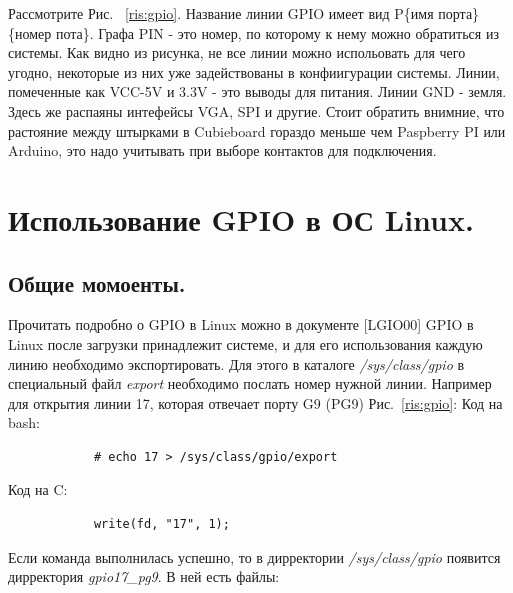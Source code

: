 \documentclass[a4paper,12pt]{report} %
\begin{document}
	Рассмотрите Рис. ~\ref{ris:gpio}. Название линии GPIO имеет вид P\{имя
	порта\}\{номер пота\}.
	Графа PIN - это номер, по которому к нему можно обратиться из системы. Как видно из рисунка, не
	все линии можно испольовать для чего угодно, некоторые из них уже задействованы
	в конфиигурации системы.\cite{hub}
	Линии, помеченные как VCC-5V и 3.3V - это выводы для питания. Линии GND - земля.
	Здесь же распаяны интефейсы VGA, SPI и другие.
	Стоит обратить внимние, что растояние между штырками в Cubieboard гораздо меньше
	чем Paspberry PI или Arduino, это надо учитывать при выборе контактов для
	подключения.
	\section{Использование GPIO в ОС Linux.}
		\subsection{Общие момоенты.}
			Прочитать подробно о GPIO в Linux можно в документе [LGIO00]
			GPIO в Linux после загрузки принадлежит системе, и для его использования каждую
			линию необходимо экспортировать. Для этого в каталоге \emph{/sys/class/gpio}
			в специальный файл \emph{export} необходимо послать номер нужной линии.
			Например для открытия линии 17, которая отвечает порту G9 (PG9) Рис.~\ref{ris:gpio}:
			Код на bash:
			\begin{verbatim}
			# echo 17 > /sys/class/gpio/export
			\end{verbatim}
			Код на C:
			\begin{verbatim}
			write(fd, "17", 1);
			\end{verbatim}
			Если команда выполнилась успешно, то в дирректории \emph{/sys/class/gpio}
			появится дирректория \emph{gpio17\_pg9}. В ней есть файлы:
\end{document}
